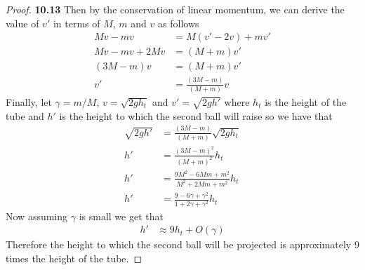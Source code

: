 \documentclass[11pt]{article}
\theoremstyle{definition}
\begin{document}
\begin{proof}{\textbf{10.13}}
        Then by the conservation of linear momentum, we can derive the value
        of $v'$ in terms of $M$, $m$ and $v$ as follows 
        \begin{align*}
            Mv - m v &= M(v' - 2v) + mv'\\
            Mv - m v + 2Mv &= (M + m)v'\\
            (3M - m)v &= (M + m)v'\\
            v' &= \frac{(3M - m)}{(M + m)} v
        \end{align*}
        Finally, let $\gamma = m/M$, $v = \sqrt{2gh_t}$ and $v' = \sqrt{2gh'}$
        where $h_t$ is the height of the tube and $h'$ is the height to which
        the second ball will raise so we have that
        \begin{align*}
            \sqrt{2gh'} &= \frac{(3M - m)}{(M + m)} \sqrt{2gh_t}\\
            h' &= \frac{(3M - m)^2}{(M + m)^2} h_t\\
            h' &= \frac{9M^2 - 6Mm + m^2}{M^2 +2Mm+ m^2} h_t\\
            h' &= \frac{9 - 6\gamma + \gamma^2}{1 +2\gamma+ \gamma^2} h_t
        \end{align*}
        Now assuming $\gamma$ is small we get that
        \begin{align*}
            h' &\approx 9h_t + O(\gamma)
        \end{align*}
        Therefore the height to which the second ball will be projected is
        approximately 9 times the height of the tube. 
    \end{proof}
\end{document}

